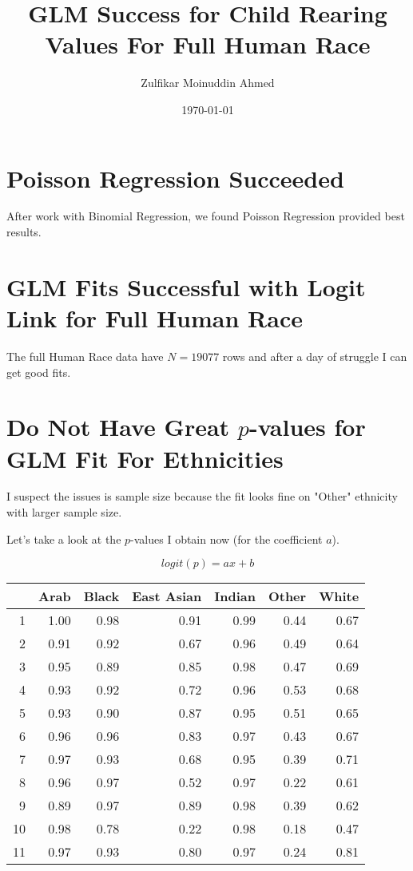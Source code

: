 \documentclass{amsart}
\title{GLM Success for Child Rearing Values For Full Human Race}
\author{Zulfikar Moinuddin Ahmed}
\date{\today}
\begin{document}
\maketitle

\section{Poisson Regression Succeeded}

After work with Binomial Regression, we found Poisson Regression provided best results.

\section{GLM Fits Successful with Logit Link for Full Human Race}

The full Human Race data have $N=19077$ rows and after a day of struggle I can get good fits.

\section{Do Not Have Great $p$-values for GLM Fit For Ethnicities}

I suspect the issues is sample size because the fit looks fine on "Other" ethnicity with larger sample size.

Let's take a look at the $p$-values I obtain now (for the coefficient $a$).

\[
logit(p) = ax + b
\]

\begin{table}[ht]
\centering
\begin{tabular}{rrrrrrr}
  \hline
 & Arab & Black & East Asian & Indian & Other & White \\ 
  \hline
1 & 1.00 & 0.98 & 0.91 & 0.99 & 0.44 & 0.67 \\ 
  2 & 0.91 & 0.92 & 0.67 & 0.96 & 0.49 & 0.64 \\ 
  3 & 0.95 & 0.89 & 0.85 & 0.98 & 0.47 & 0.69 \\ 
  4 & 0.93 & 0.92 & 0.72 & 0.96 & 0.53 & 0.68 \\ 
  5 & 0.93 & 0.90 & 0.87 & 0.95 & 0.51 & 0.65 \\ 
  6 & 0.96 & 0.96 & 0.83 & 0.97 & 0.43 & 0.67 \\ 
  7 & 0.97 & 0.93 & 0.68 & 0.95 & 0.39 & 0.71 \\ 
  8 & 0.96 & 0.97 & 0.52 & 0.97 & 0.22 & 0.61 \\ 
  9 & 0.89 & 0.97 & 0.89 & 0.98 & 0.39 & 0.62 \\ 
  10 & 0.98 & 0.78 & 0.22 & 0.98 & 0.18 & 0.47 \\ 
  11 & 0.97 & 0.93 & 0.80 & 0.97 & 0.24 & 0.81 \\ 
   \hline
\end{tabular}
\end{table}
\end{document}
